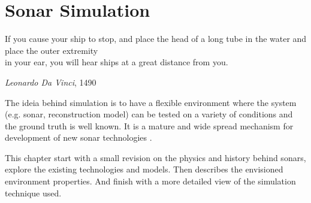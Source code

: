\chapter{Sonar Simulation}

\epigraph{If you cause your ship to stop, and place the head of a long tube in
the water and place the outer extremity\\ in your ear, you will hear ships at a
great distance from you.}{\textit{Leonardo Da Vinci}, 1490}


The ideia behind simulation is to have a flexible environment where the system
(e.g. sonar, reconstruction model) can be tested on a variety of conditions
and the ground truth is well known. It is a mature and wide spread
mechanism for development of new sonar technologies \cite{Etter2013}.

This chapter start with a small revision on the physics and history behind
sonars, explore the existing technologies and models. Then describes the
envisioned environment properties. And finish with a more detailed view of
the simulation technique used.



